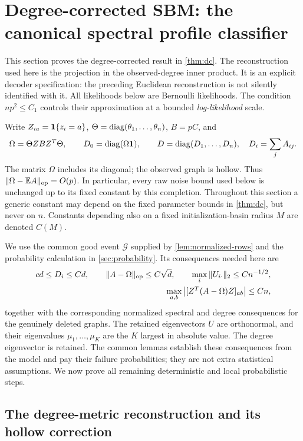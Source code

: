 \section{Degree-corrected SBM: the canonical spectral profile classifier}
\label{sec:dcsbm-proof}

This section proves the degree-corrected result in \cref{thm:dc}.
The reconstruction used here is the projection in the observed-degree
inner product.  It is an explicit decoder specification: the preceding
Euclidean reconstruction is not silently identified with it.
All likelihoods below are Bernoulli likelihoods.  The condition
\(np^2\le C_1\) controls their approximation at a bounded \emph{log-likelihood}
scale.

Write \(Z_{ia}=\mathbf1\{z_i=a\}\), \(\Theta=\operatorname{diag}(\theta_1,\ldots,\theta_n)\),
\(B=pC\), and
\[
 \Omega=\Theta ZBZ^T\Theta,\qquad
 D_0=\operatorname{diag}(\Omega\mathbf 1),\qquad
 D=\operatorname{diag}(D_1,\ldots,D_n),\quad D_i=\sum_jA_{ij}.
\]
The matrix \(\Omega\) includes its diagonal; the observed graph is hollow.
Thus \(\|\Omega-\mathbb E A\|_{\mathrm{op}}=O(p)\).  In particular, every raw noise
bound used below is unchanged up to its fixed constant by this completion.
Throughout this section a generic constant may depend on the fixed
parameter bounds in \cref{thm:dc}, but never on \(n\).  Constants depending
also on a fixed initialization-basin radius \(M\) are denoted \(C(M)\).

We use the common good event \(\mathcal G\) supplied by
\cref{lem:normalized-rows} and the probability calculation in
\cref{sec:probability}.  Its consequences needed here are
\begin{align}
 c d\le D_i\le C d,\qquad
 \|A-\Omega\|_{\mathrm{op}}\le C\sqrt d,\qquad
 \max_i\|U_{i\cdot}\|_2\le Cn^{-1/2},                    \label{dcsbm:good}\\
 \max_{a,b}\left\lvert[Z^T(A-\Omega)Z]_{ab}\right\rvert\le Cn,           \label{dcsbm:block-event}
\end{align}
together with the corresponding normalized spectral and degree
consequences for the genuinely deleted graphs.  The retained eigenvectors
\(U\) are orthonormal, and their eigenvalues \(\mu_1,\ldots,\mu_K\)
are the \(K\) largest in absolute value.  The degree eigenvector is retained.
The common lemmas establish these consequences from the model and pay
their failure probabilities; they are not extra statistical assumptions.
We now prove all remaining deterministic and local probabilistic steps.

\subsection{The degree-metric reconstruction and its hollow correction}

